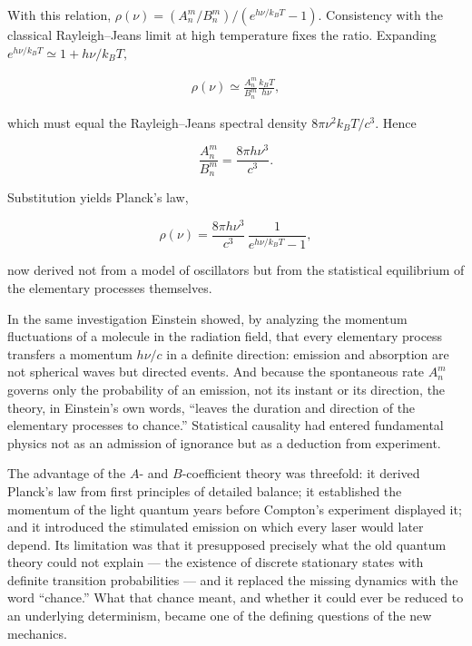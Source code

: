 With this relation, $\rho(\nu)= (A_n^m/B_n^m)/(e^{h\nu/k_BT}-1).$ Consistency with the classical Rayleigh--Jeans limit at high temperature fixes the ratio. Expanding $e^{h\nu/k_BT}\simeq1+h\nu/k_BT,$
\begin{linenomath}
    \begin{align}
        \rho(\nu)\simeq\frac{A_n^m}{B_n^m}\frac{k_BT}{h\nu},
    \end{align}
\end{linenomath}
which must equal the Rayleigh--Jeans spectral density $8\pi\nu^{2}k_BT/c^{3}.$ Hence
\begin{linenomath}
    \begin{equation}
        \frac{A_n^m}{B_n^m}=\frac{8\pi h\nu^3}{c^3}.
    \end{equation}
\end{linenomath}
Substitution yields Planck's law,
\begin{linenomath}
    \begin{equation}
        \rho(\nu)=\frac{8\pi h\nu^3}{c^3}\,\frac{1}{e^{h\nu/k_BT}-1},
    \end{equation}
\end{linenomath}
now derived not from a model of oscillators but from the statistical equilibrium of the elementary processes themselves.

In the same investigation Einstein showed, by analyzing the momentum fluctuations of a molecule in the radiation field, that every elementary process transfers a momentum $h\nu/c$ in a definite direction: emission and absorption are not spherical waves but directed events. And because the spontaneous rate $A_n^m$ governs only the probability of an emission, not its instant or its direction, the theory, in Einstein's own words, ``leaves the duration and direction of the elementary processes to chance.'' Statistical causality had entered fundamental physics not as an admission of ignorance but as a deduction from experiment.

The advantage of the $A$- and $B$-coefficient theory was threefold: it derived Planck's law from first principles of detailed balance; it established the momentum of the light quantum years before Compton's experiment displayed it; and it introduced the stimulated emission on which every laser would later depend. Its limitation was that it presupposed precisely what the old quantum theory could not explain --- the existence of discrete stationary states with definite transition probabilities --- and it replaced the missing dynamics with the word ``chance.'' What that chance meant, and whether it could ever be reduced to an underlying determinism, became one of the defining questions of the new mechanics.


